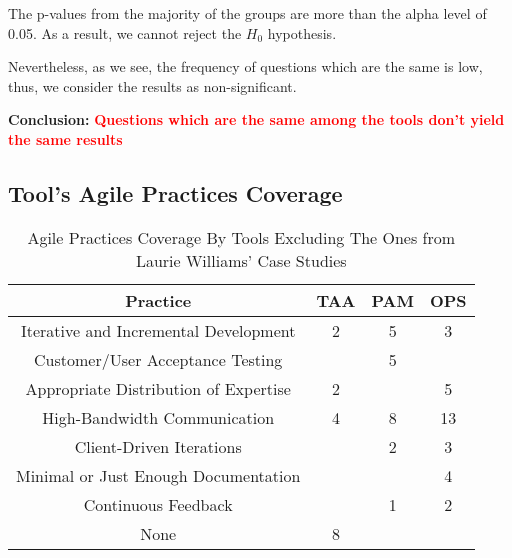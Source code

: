 The p-values from the majority of the groups are more than the alpha level of 0.05. As a result, we cannot reject the $H_0$ hypothesis.

Nevertheless, as we see, the frequency of questions which are the same is low, thus, we consider the results as non-significant.

\textbf{Conclusion:} \textcolor{red}{\textbf{Questions which are the same among the tools don't yield the same results}}

\clearpage

\subsection{Tool's Agile Practices Coverage}

\begin{table} [H]
	\footnotesize
	\begin{tabular}{| c | c | c | c |} \hline
		\textbf{Practice} & \textbf{TAA} & \textbf{PAM} & \textbf{OPS} \\ \hline
		Iterative and Incremental Development & 2 & 5 & 3 \\ \hline		
		Customer/User Acceptance Testing & & 5 & \\ \hline		
		Appropriate Distribution of Expertise & 2 & & 5 \\ \hline
		High-Bandwidth Communication & 4 & 8 & 13 \\ \hline					
		Client-Driven Iterations & & 2 & 3 \\ \hline
		Minimal or Just Enough Documentation & & & 4 \\ \hline
		Continuous Feedback & & 1 & 2 \\ \hline
	 	None & 8 & & \\ \hline
	\end{tabular}
	\caption{{\footnotesize Agile Practices Coverage By Tools Excluding The Ones from Laurie Williams' Case Studies}}
\end{table}

\clearpage

